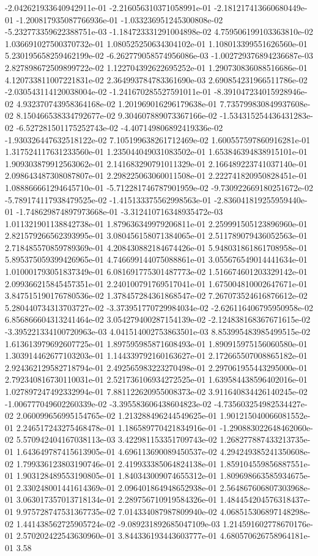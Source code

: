 -2.042621933640942911e-01	-2.216056310371058991e-01	-2.181217413660680449e-01	-1.200817935087766936e-01	-1.033236951245300808e-02	-5.232773359622388751e-03	-1.184723331291004898e-02	4.759506199103363810e-02	1.036691027500370732e-01	1.080525250634304102e-01	1.108013399551626560e-01	5.230195658259462199e-02	-6.262779058574956086e-03	-1.002729376894236687e-03	2.827898672509899722e-02	1.122704392622695252e-01	1.290730836088516686e-01	4.120733811007221831e-02	2.364993784783361690e-03	2.690854231966511786e-02	-2.030543114120038004e-02	-1.241670285527591011e-01	-8.391047234015928946e-02	4.932370743958364168e-02	1.201969016296179638e-01	7.735799830849937608e-02	8.150466538334792677e-02	9.304607889073367166e-02	-1.534315254436431283e-02	-6.527281501175252743e-02	-4.407149806892419336e-02	-1.930326447632518122e-02	7.105199638261712469e-02	1.600557597860916281e-01	1.317524117631233560e-01	1.235044049031083502e-01	1.653846394838915101e-01	1.909303879912563062e-01	2.141683290791011329e-01	2.166489223741037140e-01	2.098643487308087807e-01	2.298225063060011508e-01	2.222741820950828451e-01	1.088866661294645710e-01	-5.712281746787901959e-02	-9.730922669180251672e-02	-5.789174117938479525e-02	-1.415133375562998563e-01	-2.836041819255959440e-01	-1.748629874897973668e-01	-3.312410716348935472e-03	1.011321901138842738e-01	1.879636349979206811e-01	2.259991505123896960e-01	2.821579266562393995e-01	3.080456158071384065e-01	2.511789079436052563e-01	2.718485570859789369e-01	4.208430882184674426e-01	5.948031861861708958e-01	5.895375059399426965e-01	4.746699144075088861e-01	3.055676549014441634e-01	1.010001793051837349e-01	6.081691775301487773e-02	1.516674601203329142e-01	2.099366215845457351e-01	2.240100791769517041e-01	1.675004810002647671e-01	3.847515190176780536e-02	1.378457284361868547e-02	7.267073524616876612e-02	5.280440734313703727e-02	-3.373951770729984034e-02	-2.626116406795950958e-02	6.856866604313241464e-02	3.054279400287154139e-02	-2.124838168367671615e-02	-3.395221334100720963e-03	4.041514002753863501e-03	8.853995483985499515e-02	1.613613979692607725e-01	1.897595985871608493e-01	1.890915975156060580e-01	1.303914462677103203e-01	1.144339792160163627e-01	2.172665507008865182e-01	2.924362129582718794e-01	2.492565983223270498e-01	2.297061955443295000e-01	2.792340816730110031e-01	2.521736106934272525e-01	1.639584438596402016e-01	1.027897247492332994e-01	7.881122620955008373e-02	3.911640834426140245e-02	-1.006777049602260339e-02	-3.395583606438604823e-02	-4.735603254982534427e-02	2.060099656995154765e-02	1.213288496244549625e-01	1.901215040066081552e-01	2.246517243275468478e-01	1.186589770421834916e-01	-1.290883022648462060e-02	5.570942404167038113e-03	3.422981153351709743e-02	1.268277887433213735e-01	1.643649787415613905e-01	4.696113690089450537e-02	4.294249385241350608e-02	1.799336123803190746e-01	2.419933385064824138e-01	1.859104559856887551e-01	1.903128489553190805e-01	1.840343009074655312e-01	1.809698663585934675e-01	2.330248001441614369e-01	2.096401864948652938e-01	2.564867606807303968e-01	3.063017357013718134e-01	2.289756710919584326e-01	1.484454204576318437e-01	9.975728747531367735e-02	7.014334087987809940e-02	4.068515306897148298e-02	1.441438562725905724e-02	-9.089231892685047109e-03	1.214591602778670176e-01	2.570202422543630960e-01	3.844336193443603777e-01	4.680570626758964181e-01	3.58